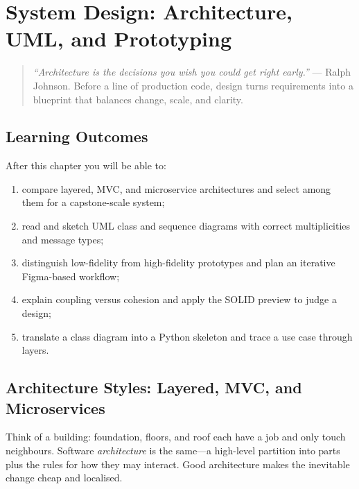 \chapter{System Design: Architecture, UML, and Prototyping}
\label{ch:design}

\begin{quote}
\emph{``Architecture is the decisions you wish you could get right early.''} --- Ralph Johnson. Before a line of production code, design turns requirements into a blueprint that balances change, scale, and clarity.
\end{quote}

\noindent{}
\vspace{0.4em}

\section*{Learning Outcomes}
After this chapter you will be able to:
\begin{enumerate}[label=(L\arabic*)]
    \item compare layered, MVC, and microservice architectures and select among them for a capstone-scale system;
    \item read and sketch UML class and sequence diagrams with correct multiplicities and message types;
    \item distinguish low-fidelity from high-fidelity prototypes and plan an iterative Figma-based workflow;
    \item explain coupling versus cohesion and apply the SOLID preview to judge a design;
    \item translate a class diagram into a Python skeleton and trace a use case through layers.
\end{enumerate}

\section{Architecture Styles: Layered, MVC, and Microservices}
\label{sec:architecture-styles}
Think of a building: foundation, floors, and roof each have a job and only touch neighbours. Software \emph{architecture} is the same---a high-level partition into parts plus the rules for how they may interact. Good architecture makes the inevitable change cheap and localised.

